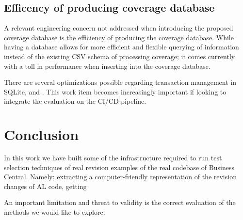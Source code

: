 \documentclass{article}
\begin{document}
\subsection{Efficency of producing coverage database}
A relevant engineering concern not addressed when introducing the proposed coverage database is the efficiency of producing the coverage database. While having a database allows for more efficient and flexible querying of information instead of the existing CSV schema of processing coverage; it comes currently with a toll in performance when inserting into the coverage database.

There are several optimizations possible regarding transaction management in SQLite, and . This work item becomes increasingly important if looking to integrate the evaluation on the CI/CD pipeline.

\section{Conclusion}
In this work we have built some of the infrastructure required to run test selection techniques of real revision examples of the real codebase of Business Central. Namely: extracting a computer-friendly representation of the revision changes of AL code, getting

An important limitation and threat to validity is the correct evaluation of the methods we would like to explore.

\printbibliography
\end{document}

